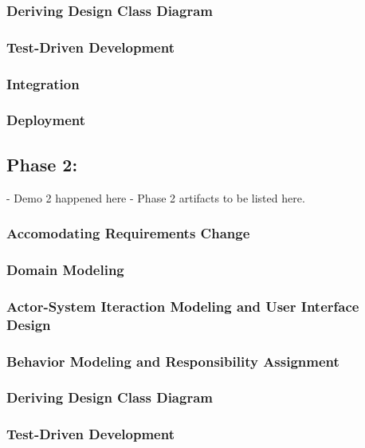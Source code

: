 \documentclass[11pt]{article}
\begin{document}
\subsubsection{Deriving Design Class Diagram}
 
\subsubsection{Test-Driven Development}
 
\subsubsection{Integration}
 
\subsubsection{Deployment}

\subsection{Phase 2:} 
 - Demo 2 happened here
 - Phase 2 artifacts to be listed here.

\subsubsection{Accomodating Requirements Change}
 
\subsubsection{Domain Modeling}
  
\subsubsection{Actor-System Iteraction Modeling and User Interface Design}
  
\subsubsection{Behavior Modeling and Responsibility Assignment}
  
\subsubsection{Deriving Design Class Diagram}
  
\subsubsection{Test-Driven Development}
  
\end{document}

